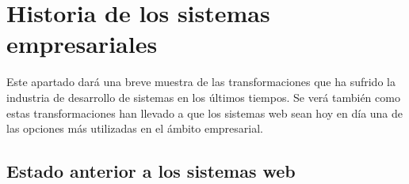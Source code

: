 \section{Historia de los sistemas empresariales}
\label{appendix:history}

Este apartado dará una breve muestra de las transformaciones que ha
sufrido la industria de desarrollo de sistemas en los últimos tiempos. Se verá 
también como estas transformaciones han llevado a que los sistemas web sean hoy 
en día una de las opciones más utilizadas en el ámbito empresarial.\\

\subsection{Estado anterior a los sistemas web}
\label{subsec:history:about_web:previous_pc}


